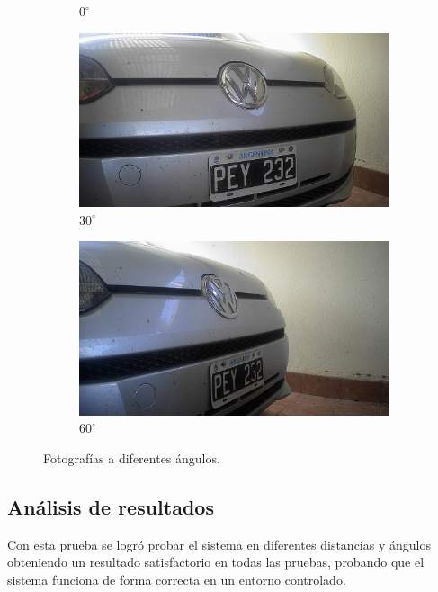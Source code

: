\begin{figure}
\begin{subfigure}{.15\textwidth}
        \caption{$0^\circ$}
    \end{subfigure}
    \begin{subfigure}{.15\textwidth}
        \centering
        \includegraphics[width=\textwidth]{imgs/test-angulos/30_50.jpg}
        \caption{$30^\circ$}
    \end{subfigure}
    \begin{subfigure}{.15\textwidth}
        \centering
        \includegraphics[width=\textwidth]{imgs/test-angulos/60_50.jpg}
        \caption{$60^\circ$}
    \end{subfigure}
    \caption{Fotografías a diferentes ángulos.}
    \label{fig:fotos-angulo}
\end{figure}

\subsection{Análisis de resultados}

Con esta prueba se logró probar el sistema en diferentes distancias y ángulos obteniendo un resultado satisfactorio en todas las pruebas, probando que el sistema funciona de forma correcta en un entorno controlado.

